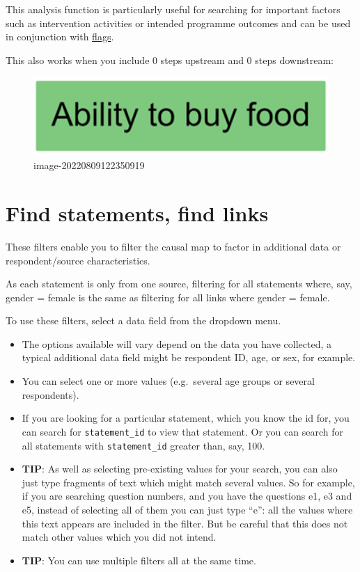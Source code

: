 \documentclass[
]{book}
\providecommand{\tightlist}{%
  \setlength{\itemsep}{0pt}\setlength{\parskip}{0pt}}
\begin{document}
This analysis function is particularly useful for searching for important factors such as intervention activities or intended programme outcomes and can be used in conjunction with \protect\hyperlink{xflags}{flags}.

This also works when you include 0 steps upstream and 0 steps downstream:

\begin{figure}
\centering
\includegraphics[width=6.77083in,height=\textheight]{_assets/image-20220809122350919.png}
\caption{image-20220809122350919}
\end{figure}

\hypertarget{xfind-statements-links}{%
\section{Find statements, find links}\label{xfind-statements-links}}

These filters enable you to filter the causal map to factor in additional data or respondent/source characteristics.

As each statement is only from one source, filtering for all statements where, say, gender = female is the same as filtering for all links where gender = female.

To use these filters, select a data field from the dropdown menu.

\begin{itemize}
\tightlist
\item
  The options available will vary depend on the data you have collected, a typical additional data field might be respondent ID, age, or sex, for example.
\item
  You can select one or more values (e.g.~several age groups or several respondents).
\item
  If you are looking for a particular statement, which you know the id for, you can search for \texttt{statement\_id} to view that statement. Or you can search for all statements with \texttt{statement\_id} greater than, say, 100.
\item
  \textbf{TIP}: As well as selecting pre-existing values for your search, you can also just type fragments of text which might match several values. So for example, if you are searching question numbers, and you have the questions e1, e3 and e5, instead of selecting all of them you can just type ``e'': all the values where this text appears are included in the filter. But be careful that this does not match other values which you did not intend.
\item
  \textbf{TIP}: You can use multiple filters all at the same time.
\end{itemize}
\end{document}
